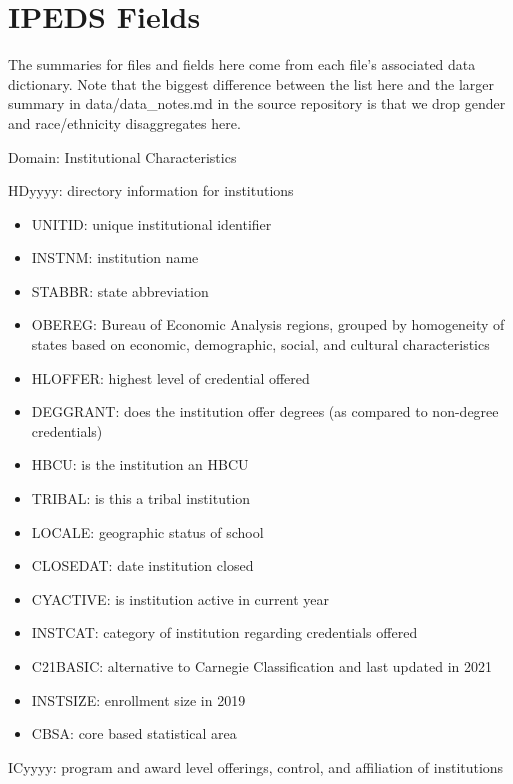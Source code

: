 \documentclass[sigconf, authorversion, nonacm]{acmart}
\begin{document}



\appendix

\section{IPEDS Fields}
    The summaries for files and fields here come from each file's associated data dictionary. Note that the biggest difference between the list here and the larger summary in data/data\_notes.md in the source repository is that we drop gender and race/ethnicity disaggregates here.

    Domain: Institutional Characteristics

    HDyyyy: directory information for institutions

    \begin{itemize}
        \item UNITID: unique institutional identifier
        \item INSTNM: institution name
        \item STABBR: state abbreviation
        \item OBEREG: Bureau of Economic Analysis regions, grouped by homogeneity of states based on economic, demographic, social, and cultural characteristics
        \item HLOFFER: highest level of credential offered
        \item DEGGRANT: does the institution offer degrees (as compared to non-degree credentials)
        \item HBCU: is the institution an HBCU
        \item TRIBAL: is this a tribal institution
        \item LOCALE: geographic status of school
        \item CLOSEDAT: date institution closed
        \item CYACTIVE: is institution active in current year
        \item INSTCAT: category of institution regarding credentials offered
        \item C21BASIC: alternative to Carnegie Classification and last updated in 2021
        \item INSTSIZE: enrollment size in 2019
        \item CBSA: core based statistical area
    \end{itemize}

    ICyyyy: program and award level offerings, control, and affiliation of institutions
\end{document}
